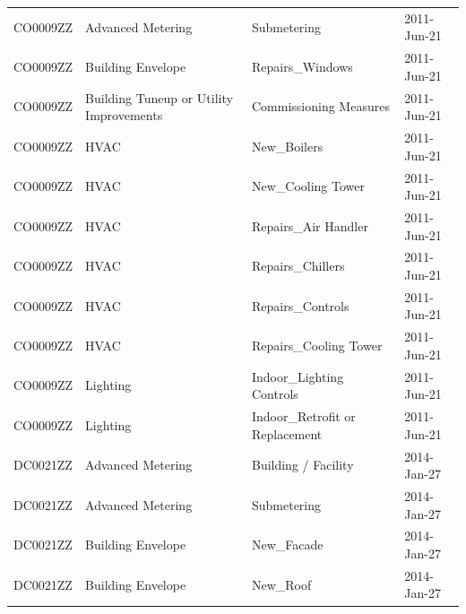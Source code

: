 \documentclass[12pt]{article}
\begin{document}
\begin{longtable}{lp{4cm}p{4cm}p{3cm}}
CO0009ZZ         & Advanced Metering                       & Submetering                               & 2011-Jun-21                   \\
CO0009ZZ         & Building Envelope                       & Repairs\_Windows                          & 2011-Jun-21                   \\
CO0009ZZ         & Building Tuneup or Utility Improvements & Commissioning Measures                    & 2011-Jun-21                   \\
CO0009ZZ         & HVAC                                    & New\_Boilers                              & 2011-Jun-21                   \\
CO0009ZZ         & HVAC                                    & New\_Cooling Tower                        & 2011-Jun-21                   \\
CO0009ZZ         & HVAC                                    & Repairs\_Air Handler                      & 2011-Jun-21                   \\
CO0009ZZ         & HVAC                                    & Repairs\_Chillers                         & 2011-Jun-21                   \\
CO0009ZZ         & HVAC                                    & Repairs\_Controls                         & 2011-Jun-21                   \\
CO0009ZZ         & HVAC                                    & Repairs\_Cooling Tower                    & 2011-Jun-21                   \\
CO0009ZZ         & Lighting                                & Indoor\_Lighting Controls                 & 2011-Jun-21                   \\
CO0009ZZ         & Lighting                                & Indoor\_Retrofit or Replacement           & 2011-Jun-21                   \\
DC0021ZZ         & Advanced Metering                       & Building / Facility                       & 2014-Jan-27                   \\
DC0021ZZ         & Advanced Metering                       & Submetering                               & 2014-Jan-27                   \\
DC0021ZZ         & Building Envelope                       & New\_Facade                               & 2014-Jan-27                   \\
DC0021ZZ         & Building Envelope                       & New\_Roof                                 & 2014-Jan-27                   \\

\end{longtable}
\end{document}
